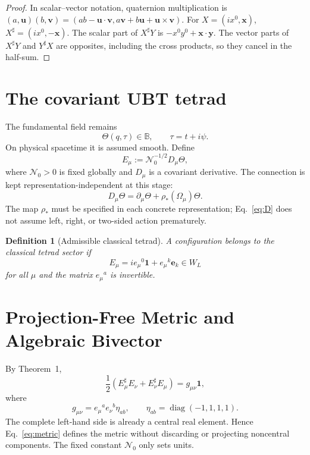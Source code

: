 \documentclass[12pt,a4paper]{article}
\newtheorem{definition}{Definition}[section]
\theoremstyle{remark}\newtheorem{remark}[definition]{Remark}
\newcommand{\B}{\mathbb B}
\begin{document}
\begin{proof}
In scalar--vector notation, quaternion multiplication is
$(a,\mathbf u)(b,\mathbf v)=(ab-\mathbf u\cdot\mathbf v,
 a\mathbf v+b\mathbf u+\mathbf u\times\mathbf v)$.
For $X=(ix^0,\mathbf x)$, $X^\sharp=(ix^0,-\mathbf x)$.  The scalar part of
$X^\sharp Y$ is $-x^0y^0+\mathbf x\cdot\mathbf y$.  The vector parts of
$X^\sharp Y$ and $Y^\sharp X$ are opposites, including the cross products, so
they cancel in the half-sum.
\end{proof}

\section{The covariant UBT tetrad}
The fundamental field remains
\[
 \Theta(q,\tau)\in\B,\qquad \tau=t+i\psi.
\]
On physical spacetime it is assumed smooth.  Define
\begin{equation}
 \boxed{E_\mu:=\mathcal N_0^{-1/2}D_\mu\Theta,}
 \label{eq:E}
\end{equation}
where $\mathcal N_0>0$ is fixed globally and $D_\mu$ is a covariant derivative.
The connection is kept representation-independent at this stage:
\begin{equation}
 D_\mu\Theta=\partial_\mu\Theta+\rho_*(\Omega_\mu)\Theta.
 \label{eq:D}
\end{equation}
The map $\rho_*$ must be specified in each concrete representation; Eq.~\eqref{eq:D}
does not assume left, right, or two-sided action prematurely.

\begin{definition}[Admissible classical tetrad]
A configuration belongs to the classical tetrad sector if
\[
 E_\mu=i e_\mu{}^0\mathbf1+e_\mu{}^k\mathbf e_k\in W_L
\]
for all $\mu$ and the matrix $e_\mu{}^a$ is invertible.
\end{definition}

\section{Projection-Free Metric and Algebraic Bivector}
By Theorem~1,
\begin{equation}
 \boxed{\frac12(E_\mu^\sharp E_\nu+E_\nu^\sharp E_\mu)
       =g_{\mu\nu}\mathbf1,}
 \label{eq:metric}
\end{equation}
where
\begin{equation}
 g_{\mu\nu}=e_\mu{}^ae_\nu{}^b\eta_{ab},
 \qquad \eta_{ab}=\operatorname{diag}(-1,1,1,1).
 \label{eq:tetradmetric}
\end{equation}
The complete left-hand side is already a central real element.  Hence
Eq.~\eqref{eq:metric} defines the metric without discarding or projecting
noncentral components.  The fixed constant $\mathcal N_0$ only sets units.
\end{document}
